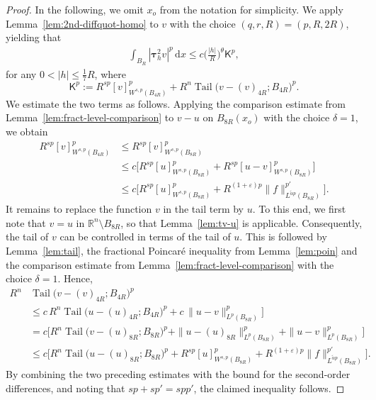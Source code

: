 \documentclass[10pt,letterpaper]{amsart}
\theoremstyle{definition}
\numberwithin{theorem}{section}
\numberwithin{equation}{section}
\newcommand{\1}{\ensuremath{\mathds{1}}}
\newcommand{\dx}{\mathrm{d}x}
\newcommand\sfK{{\boldsymbol{\mathsf K}}}
\renewcommand{\epsilon}{\varepsilon}
\renewcommand{\epsilon}{\varepsilon}
\DeclareMathOperator{\Tail}{Tail}
\numberwithin{equation}{section}
\begin{document}
\begin{proof}
In the following, we omit $x_o$ from the notation for simplicity.
We apply Lemma~\ref{lem:2nd-diffquot-homo}  to $v$ with the choice $(q,r,R)=(p,R,2R)$, yielding that
\begin{align*}
    \int_{B_{R}} |\boldsymbol{\tau}_h^2 v|^p \, \dx 
    \leq 
    c \Big(\frac{|h|}{R}\Big)^{\theta} 
    \sfK^p, 
\end{align*} 
for any $0<|h|\le \frac17 R$, where
$$
    \sfK^p
    :=
    R^{s p} [v]_{W^{s,p}(B_{4R})}^p +
    R^{n} \Tail\big(v-(v)_{4R}; B_{4R}\big)^p .
$$
We estimate the two terms as follows. 
Applying the comparison estimate from Lemma~\ref{lem:fract-level-comparison} 
to $v-u$ on $B_{8R}(x_o)$ with the choice $\delta=1$, we obtain
\begin{align*}
    R^{s p} [v]_{W^{s,p}(B_{4R})}^p 
    &\le 
    R^{s p} [v]_{W^{s,p}(B_{8R})}^p \\
    &\le c\Big[
    R^{s p} [u]_{W^{s,p}(B_{8R})}^p+
    R^{s p} [u-v]_{W^{s,p}(B_{8R})}^p
    \Big]\\
    &
    \le c\Big[
    R^{s p} [u]_{W^{s,p}(B_{8R})}^p
    +
    R^{(1+\epsilon)p} \|f\|_{L^{\tilde\alpha p}(B_{8R})}^{p'}
    \Big].
\end{align*}
It remains to replace the function $v$ in the tail term by $u$.
To this end, we first note that $v=u$ in $\mathbb{R}^n\setminus B_{8R}$, so that Lemma~\ref{lem:tv-u} is applicable.
Consequently, the tail of $v$ can be controlled in terms of the tail of $u$. This is followed by Lemma~\ref{lem:tail}, the fractional Poincar\'e inequality from Lemma~\ref{lem:poin} and the comparison estimate from
Lemma~\ref{lem:fract-level-comparison} with the choice $\delta=1$. Hence,
 \begin{align*}
    R^{n} & \Tail\big(v-(v)_{4R}; B_{4R}\big)^p \\
    &\le 
    c\,R^{n} \Tail\big(u-(u)_{4R}; B_{4R}\big)^p +
    c\,\|u-v\|^p_{L^p(B_{8R})} \Big] \\
    &=
    c\Big[ R^{n} \Tail\big(v-(u)_{8R}; B_{8R}\big)^p +
    \|u-(u)_{8R}\|^p_{L^p(B_{8R})} + 
    \|u-v\|^p_{L^p(B_{8R})} \Big]\\
    &\le 
    c\Big[ R^n\Tail\big(u- (u)_{8R}; B_{8R}\big)^p +
    R^{s p} [u]_{W^{s,p}(B_{8R})}^p +
    R^{(1+\epsilon)p} \|f\|_{L^{\tilde\alpha p}(B_{8R})}^{p'} \Big] .
\end{align*}
By combining the two preceding estimates with the bound for the second-order differences, and noting that $sp+sp'=spp'$, the claimed inequality follows. 
\end{proof}
\end{document}
